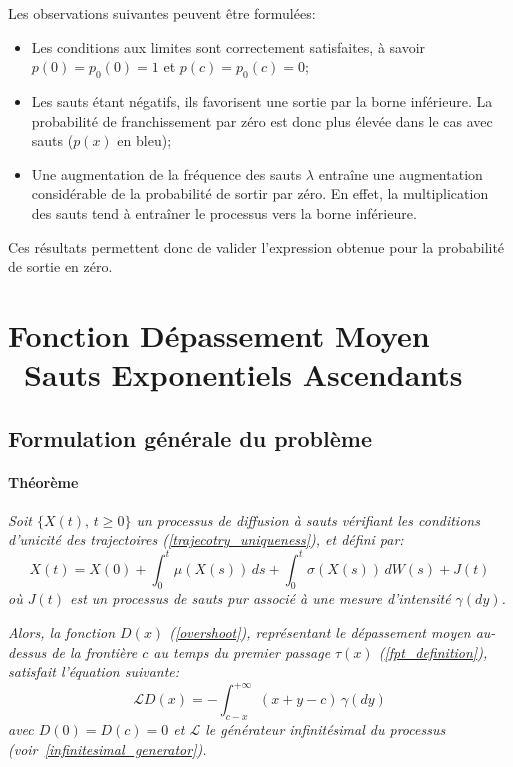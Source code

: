 Les observations suivantes peuvent être formulées:
\begin{itemize}
    \item Les conditions aux limites sont correctement satisfaites, à savoir \( p(0) = p_0(0) = 1 \) et \( p(c) = p_0(c) = 0 \);
    \item Les sauts étant négatifs, ils favorisent une sortie par la borne inférieure. La probabilité de franchissement par zéro est donc plus élevée dans le cas avec sauts ($p(x)$ en bleu);
    \item Une augmentation de la fréquence des sauts $\lambda$ entraîne une augmentation considérable de la probabilité de sortir par zéro. En effet, la multiplication des sauts tend à entraîner le processus vers la borne inférieure.
\end{itemize}
Ces résultats permettent donc de valider l'expression obtenue pour la probabilité de sortie en zéro.

\section{Fonction Dépassement Moyen \textemdash~Sauts Exponentiels Ascendants}
\subsection{Formulation générale du problème}
\paragraph{Théorème} 
\textit{Soit \(\{X(t),\,t \geq 0\}\) un processus de diffusion à sauts vérifiant les conditions d'unicité des trajectoires (\ref{trajecotry_uniqueness}), et défini par:}
\[
X(t) = X(0) + \int_0^t \mu(X(s))\,ds + \int_0^t \sigma(X(s))\,dW(s) + J(t)
\]
\textit{où \(J(t)\) est un processus de sauts pur associé à une mesure d'intensité \(\gamma(dy)\).}  

\textit{Alors, la fonction \(D(x)\) (\ref{overshoot}), représentant le dépassement moyen au-dessus de la frontière \(c\) au temps du premier passage \(\tau(x)\) (\ref{fpt_definition}), satisfait l'équation suivante:}
\begin{equation}\label{general_overshoot_ide}
    \mathcal{L}D(x) = -\int_{c - x}^{+\infty} (x + y - c)\,\gamma(dy)
\end{equation}
\textit{avec \(D(0) = D(c) = 0\) et \(\mathcal{L}\) le générateur infinitésimal du processus (voir~\ref{infinitesimal_generator}).}

